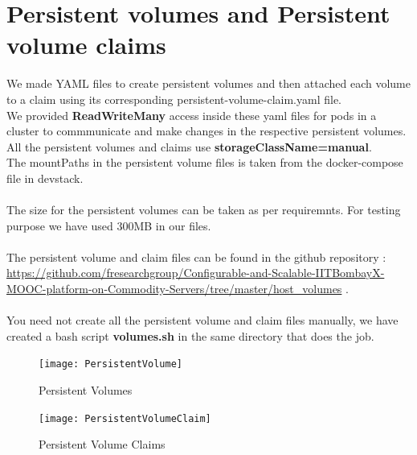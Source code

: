 \documentclass[12pt]{report}
\begin{document}
\section{Persistent volumes and Persistent volume claims}
We made YAML files to create persistent volumes and then attached each volume to a claim using its corresponding persistent-volume-claim.yaml file.\\
We provided \textbf{ReadWriteMany} access inside these yaml files for pods in a cluster to commmunicate and make changes in the respective persistent volumes.\\
All the persistent volumes and claims use \textbf{storageClassName=manual}.\\
The mountPaths in the persistent volume files is taken from the docker-compose file in devstack.\\\\
The size for the persistent volumes can be taken as per requiremnts. For testing purpose we have used 300MB in our files. \\\\
The persistent volume and claim files can be found in the github repository :\\ \href{https://github.com/fresearchgroup/Configurable-and-Scalable-IITBombayX-MOOC-platform-on-Commodity-Servers/tree/master/host_volumes}{https://github.com/fresearchgroup/Configurable-and-Scalable-IITBombayX-MOOC-platform-on-Commodity-Servers/tree/master/host\_volumes} \cite{Hostvolumes}. \\\\You need not create all the persistent volume and claim files manually, we have created a bash script \textbf{volumes.sh} in the same directory that does the job. 
\begin{figure}[h!]
	\begin{center}
		\texttt{[image: PersistentVolume]}
		\caption{Persistent Volumes}
	\end{center}
\end{figure}
\begin{figure}[h!]
	\begin{center}
		\texttt{[image: PersistentVolumeClaim]}
		\caption{Persistent Volume Claims}
	\end{center}
\end{figure}
\\\\\\\\\\
\end{document}
